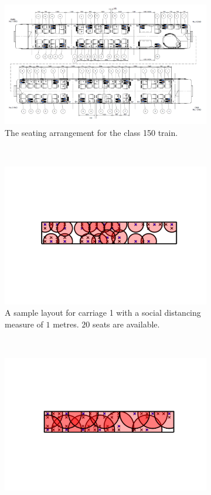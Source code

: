 \documentclass[11pt,a4paper]{article}
\begin{document}
\begin{figure}[ht!]
\centering
\vspace{-1.5cm}
\begin{subfigure}[h]{0.95\linewidth}
\centering
\includegraphics[scale = 0.6]{floorplan150.png}
\caption{The seating arrangement for the class 150 train.}
\label{Reference}
\end{subfigure}
~
\begin{subfigure}[h]{0.49\linewidth}
\centering
\includegraphics[width = \linewidth]{class150_first_car_1m.png}
\caption{A sample layout for carriage 1 with a social distancing measure of $1$ metres. $20$ seats are available.}
\label{OneMetre1}
\end{subfigure}
~
\begin{subfigure}[h]{0.490\linewidth}
\centering
\includegraphics[width = \linewidth]{class150_first_car_2m.png}

\end{subfigure}
\end{figure}
\end{document}
